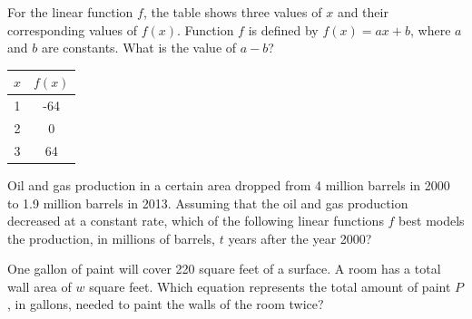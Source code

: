 \vspace{1em}

For the linear function \( f \), the table shows three values of \( x \) and their corresponding values of \( f(x) \). Function \( f \) is defined by \( f(x) = ax + b \), where \( a \) and \( b \) are constants. What is the value of \( a - b \)?

\begin{center}
\begin{tabular}{|c|c|}
\hline
$x$ & $f(x)$ \\
\hline
1 & -64 \\
2 & 0 \\
3 & 64 \\
\hline
\end{tabular}
\end{center}

\vspace{0.75em}


\vspace{2em}

\noindent\markforreview

\vspace{1em}

Oil and gas production in a certain area dropped from 4 million barrels in 2000 to 1.9 million barrels in 2013. Assuming that the oil and gas production decreased at a constant rate, which of the following linear functions \( f \) best models the production, in millions of barrels, \( t \) years after the year 2000?

\vspace{0.75em}


\newpage



\noindent\markforreview

\vspace{1em}

One gallon of paint will cover 220 square feet of a surface. A room has a total wall area of \( w \) square feet. Which equation represents the total amount of paint \( P \), in gallons, needed to paint the walls of the room twice?

\vspace{0.75em}

